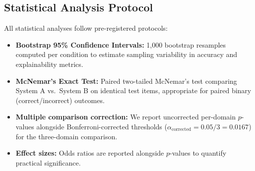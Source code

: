 \documentclass[sigconf,screen]{acmart}
\begin{document}
\subsection{Statistical Analysis Protocol}
All statistical analyses follow pre-registered protocols:
\begin{itemize}[leftmargin=*]
    \item \textbf{Bootstrap 95\% Confidence Intervals:} 1,000 bootstrap resamples \cite{efron1994introduction} computed per condition to estimate sampling variability in accuracy and explainability metrics.
    \item \textbf{McNemar's Exact Test:} Paired two-tailed McNemar's test \cite{mcnemar1947note} comparing System A vs.\ System B on identical test items, appropriate for paired binary (correct/incorrect) outcomes.
    \item \textbf{Multiple comparison correction:} We report uncorrected per-domain $p$-values alongside Bonferroni-corrected thresholds ($\alpha_{\text{corrected}} = 0.05/3 = 0.0167$) for the three-domain comparison.
    \item \textbf{Effect sizes:} Odds ratios are reported alongside $p$-values to quantify practical significance.
\end{itemize}

\begin{table}[t]
\centering
\small
\setlength{\tabcolsep}{4.5pt}
\renewcommand{\arraystretch}{1.15}
\caption{Main Evaluation Benchmark Results Across Three Enterprise Domains ($N=90$, 1,000 Bootstrap Resamples)}
\label{tab:main_results}
\end{table}
\end{document}
